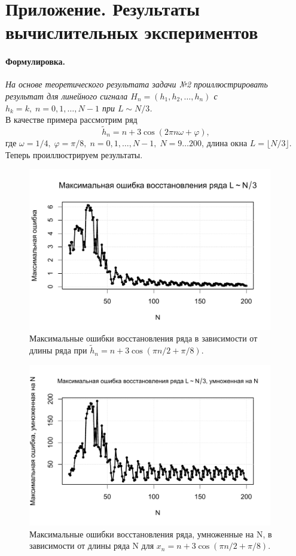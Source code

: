 \documentclass[specialist,
               substylefile = spbu_report.rtx,
               subf,href,colorlinks=true, 12pt]{disser}
\newenvironment{formulation}{\paragraph{Формулировка.}}{\hfill}
\begin{document}
\section{Приложение. Результаты вычислительных экспериментов}
\begin{formulation}
	\textit{На основе теоретического результата задачи №2 проиллюстрировать результат для линейного сигнала $H_n = (h_1, h_2, \dots, h_n)$ с $h_k = k,\;n=0,1,\dots,N-1$ при $L\sim N/3$.}
\end{formulation}\\
В качестве примера рассмотрим ряд
\begin{equation*}
	\widetilde{h}_n = n + 3\cos(2\pi n\omega + \varphi),
\end{equation*}
где $\omega = 1/4,\;\varphi = \pi/8,\;n=0,1,\dots,N-1,\;N=9\dots200$, длина окна $L=\lfloor N/3\rfloor$.
Теперь проиллюстрируем результаты.
\begin{figure}[!h]
	\includegraphics[width=0.95\textwidth]{Pictures/MaxERS.pdf}
	\caption{Максимальные ошибки восстановления ряда в зависимости от длины ряда при $\widetilde{h}_n = n + 3\cos(\pi n/2 + \pi/8)$.}\label{pic:1}
\end{figure}
\begin{figure}[!h]
	\includegraphics[width=0.95\textwidth]{Pictures/MaxERSNo.pdf}
	\caption{Максимальные ошибки восстановления ряда, умноженные на N, в зависимости от длины ряда N для $x_n = n + 3\cos(\pi n/2 + \pi/8)$.}\label{pic:2}
\end{figure}
\end{document}
